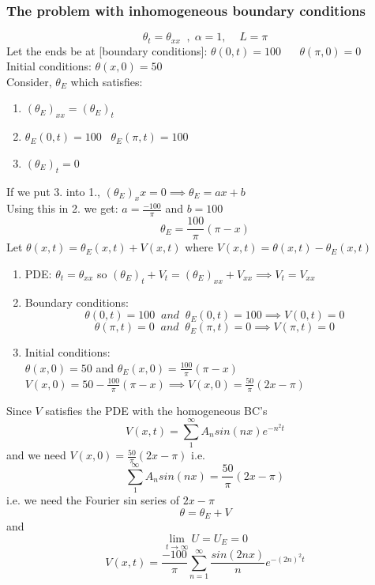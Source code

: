\documentclass[11pt]{article}
\theoremstyle{definition}
\begin{document}
\subsubsection{The problem with inhomogeneous boundary conditions}
$$\theta_t = \theta_{xx}\;\;, \; \alpha = 1,\;\;\;\; L = \pi$$
Let the ends be at [boundary conditions]:
$\theta(0,t) = 100\;\;\;\;\;\; \theta(\pi,0) = 0$\\
Initial conditions: $\theta(x,0) = 50$\\
Consider, $\theta_E$ which satisfies:
\begin{enumerate}[topsep=0pt]
    \item $(\theta_E)_{xx} = (\theta_E)_t$
    \item $\theta_E(0,t) = 100\;\;\; \theta_E(\pi,t) = 100$
    \item $(\theta_E)_t = 0$
\end{enumerate}
If we put 3. into 1., $(\theta_E)_xx = 0 \implies \theta_E = ax + b$\\
Using this in 2. we get:
$a = \frac{-100}{\pi}$ and $b = 100$
$$\theta_E = \frac{100}{\pi}(\pi - x)$$
Let $\theta(x,t) = \theta_E(x,t) + V(x,t)$ where $ V(x,t) = \theta(x,t) - \theta_E(x,t)$
\begin{enumerate}
    \item PDE: $\theta_t = \theta_{xx}$ so $(\theta_E)_t + V_t = (\theta_E)_{xx} + V_{xx} \implies V_t = V_{xx}$
    \item Boundary conditions: $$\theta(0,t) = 100\;\; and \;\; \theta_E(0,t) = 100 \implies V(0,t) = 0$$  $$\theta(\pi,t) = 0\;\; and \;\; \theta_E(\pi,t) = 0 \implies V(\pi,t) = 0$$
    \item Initial conditions:\\
    $\theta(x,0) = 50$ and $\theta_E(x,0) = \frac{100}{\pi}(\pi - x)$\\
    $V(x,0) = 50 - \frac{100}{\pi}(\pi - x) \implies V(x,0) = \frac{50}{\pi}(2x-\pi)$
\end{enumerate}
Since $V$ satisfies the PDE with the homogeneous BC's
$$V(x,t) = \sum_1^{\infty} A_n sin(nx) e^{-n^2 t}$$ and we need $V(x,0) = \frac{50}{\pi}(2x - \pi)$ i.e. $$\sum_1^{\infty}A_n sin(nx) = \frac{50}{\pi}(2x - \pi)$$ i.e. we need the Fourier sin series of $2x-\pi$
$$\theta = \theta_E + V$$ and $$\lim_{t \to \infty} U = U_E = 0$$
$$V(x,t) = \frac{-100}{\pi}\sum_{n= 1}^{\infty} \frac{sin(2nx)}{n}e^{-(2n)^2t}$$
\newpage
\end{document}
